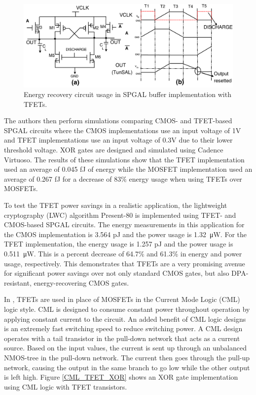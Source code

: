 \documentclass[conference, 12pt]{IEEEtran}
\newcommand{\x}{1}						%
\begin{document}
			\begin{figure}[tbp]
				\centering
				\includegraphics[width=\x\linewidth]{ReportFiles/SPGAL_Buffer.png}
				\caption{Energy recovery circuit usage in SPGAL buffer implementation with TFETs.\cite{b3}}
				\label{SPGAL_Buffer}
			\end{figure}

			The authors then perform simulations comparing CMOS- and TFET-based SPGAL circuits where the CMOS implementations use an input voltage of 1V and TFET implementations use an input voltage of 0.3V due to their lower threshold voltage. XOR gates are designed and simulated using Cadence Virtuoso. The results of these simulations show that the TFET implementation used an average of 0.045 fJ of energy while the MOSFET implementation used an average of 0.267 fJ for a decrease of 83\% energy usage when using TFETs over MOSFETs. 

			To test the TFET power savings in a realistic application, the lightweight cryptography (LWC) algorithm Present-80 is implemented using TFET- and CMOS-based SPGAL circuits. The energy measurements in this application for the CMOS implementation is 3.564 pJ and the power usage is \SI{1.32}{\micro\watt}. For the TFET implementation, the energy usage is 1.257 pJ and the power usage is \SI{0.511}{\micro\watt}. This is a percent decrease of 64.7\% and 61.3\% in energy and power usage, respectively. This demonstrates that TFETs are a very promising avenue for significant power savings over not only standard CMOS gates, but also DPA-resistant, energy-recovering CMOS gates.

			In \cite{b4}, TFETs are used in place of MOSFETs in the Current Mode Logic (CML) logic style. CML is designed to consume constant power throughout operation by applying constant current to the circuit. An added benefit of CML logic designs is an extremely fast switching speed to reduce switching power. A CML design operates with a tail transistor in the pull-down network that acts as a current source. Based on the input values, the current is sent up through an unbalanced NMOS-tree in the pull-down network. The current then goes through the pull-up network, causing the output in the same branch to go low while the other output is left high. Figure \ref{CML_TFET_XOR} shows an XOR gate implementation using CML logic with TFET transistors.
\end{document}
